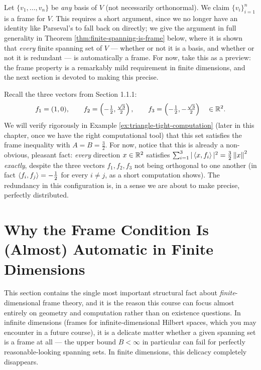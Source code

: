 \begin{examplebox}[title={Example 2.2: An arbitrary basis is a frame}]
\label{ex:basis-is-frame}
Let $\{v_1, \dots, v_n\}$ be \emph{any} basis of $V$ (not necessarily orthonormal). We claim $\{v_i\}_{i=1}^n$ is a frame for $V$. This requires a short argument, since we no longer have an identity like Parseval's to fall back on directly; we give the argument in full generality in Theorem \ref{thm:finite-spanning-is-frame} below, where it is shown that \emph{every} finite spanning set of $V$ --- whether or not it is a basis, and whether or not it is redundant --- is automatically a frame. For now, take this as a preview: the frame property is a remarkably mild requirement in finite dimensions, and the next section is devoted to making this precise.
\end{examplebox}

\begin{examplebox}[title={Example 2.3: The triangular frame from Chapter 1}]
\label{ex:triangle-is-frame}
Recall the three vectors from Section 1.1.1:
$$
f_1 = (1, 0), \qquad f_2 = \left(-\tfrac{1}{2}, \tfrac{\sqrt 3}{2}\right), \qquad f_3 = \left(-\tfrac{1}{2}, -\tfrac{\sqrt 3}{2}\right) \quad \in \mathbb{R}^2.
$$
We will verify rigorously in Example \ref{ex:triangle-tight-computation} (later in this chapter, once we have the right computational tool) that this set satisfies the frame inequality with $A = B = \tfrac{3}{2}$. For now, notice that this is already a non-obvious, pleasant fact: \emph{every} direction $x \in \mathbb{R}^2$ satisfies $\sum_{i=1}^3 |\left\langle x, f_i \right\rangle|^2 = \tfrac{3}{2}\left\| x \right\|^2$ \emph{exactly}, despite the three vectors $f_1, f_2, f_3$ not being orthogonal to one another (in fact $\left\langle f_i, f_j \right\rangle = -\tfrac12$ for every $i \ne j$, as a short computation shows). The redundancy in this configuration is, in a sense we are about to make precise, perfectly distributed.
\end{examplebox}

\section{Why the Frame Condition Is (Almost) Automatic in Finite Dimensions}
\label{sec:automatic-in-finite-dim}

This section contains the single most important structural fact about \emph{finite}-dimensional frame theory, and it is the reason this course can focus almost entirely on geometry and computation rather than on existence questions. In infinite dimensions (frames for infinite-dimensional Hilbert spaces, which you may encounter in a future course), it is a delicate matter whether a given spanning set is a frame at all --- the upper bound $B < \infty$ in particular can fail for perfectly reasonable-looking spanning sets. In finite dimensions, this delicacy completely disappears.

